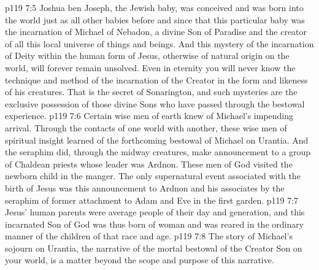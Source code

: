 \vs p119 7:5 Joshua ben Joseph, the Jewish baby, was conceived and was born into the world just as all other babies before and since  that this particular baby was the incarnation of Michael of Nebadon, a divine Son of Paradise and the creator of all this local universe of things and beings. And this mystery of the incarnation of Deity within the human form of Jesus, otherwise of natural origin on the world, will forever remain unsolved. Even in eternity you will never know the technique and method of the incarnation of the Creator in the form and likeness of his creatures. That is the secret of Sonarington, and such mysteries are the exclusive possession of those divine Sons who have passed through the bestowal experience.
\vs p119 7:6 Certain wise men of earth knew of Michael’s impending arrival. Through the contacts of one world with another, these wise men of spiritual insight learned of the forthcoming bestowal of Michael on Urantia. And the seraphim did, through the midway creatures, make announcement to a group of Chaldean priests whose leader was Ardnon. These men of God visited the newborn child in the manger. The only supernatural event associated with the birth of Jesus was this announcement to Ardnon and his associates by the seraphim of former attachment to Adam and Eve in the first garden.
\vs p119 7:7 Jesus’ human parents were average people of their day and generation, and this incarnated Son of God was thus born of woman and was reared in the ordinary manner of the children of that race and age.
\vs p119 7:8 \pc The story of Michael’s sojourn on Urantia, the narrative of the mortal bestowal of the Creator Son on your world, is a matter beyond the scope and purpose of this narrative.
